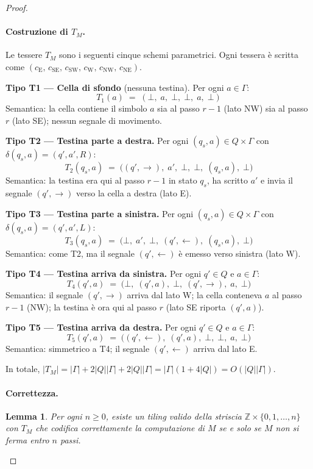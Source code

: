 \documentclass[12pt, a4paper]{article}
\newtheorem{lemma}{Lemma}
\newcommand{\moveR}{\!\rightarrow\!}
\newcommand{\moveL}{\!\leftarrow\!}
\newcommand{\edgeE}{c_{\mathrm{E}}}
\newcommand{\edgeSE}{c_{\mathrm{SE}}}
\newcommand{\edgeSW}{c_{\mathrm{SW}}}
\newcommand{\edgeW}{c_{\mathrm{W}}}
\newcommand{\edgeNW}{c_{\mathrm{NW}}}
\newcommand{\edgeNE}{c_{\mathrm{NE}}}
\begin{document}
\begin{proof}
\paragraph{Costruzione di $T_M$.}
Le tessere $T_M$ sono i seguenti cinque schemi parametrici.
Ogni tessera è scritta come $(\edgeE,\, \edgeSE,\, \edgeSW,\, \edgeW,\, \edgeNW,\, \edgeNE)$.

\medskip
\noindent\textbf{Tipo T1 — Cella di sfondo} (nessuna testina).
Per ogni $a \in \Gamma$:
\[
  T_1(a) \;=\; (\bot,\; a,\; \bot,\; \bot,\; a,\; \bot)
\]
Semantica: la cella contiene il simbolo $a$ sia al passo $r-1$ (lato NW) sia al passo $r$
(lato SE); nessun segnale di movimento.

\medskip
\noindent\textbf{Tipo T2 — Testina parte a destra.}
Per ogni $(q_s, a) \in Q \times \Gamma$ con $\delta(q_s, a) = (q', a', R)$:
\[
  T_2(q_s, a) \;=\; \bigl((q', \moveR),\; a',\; \bot,\; \bot,\; (q_s, a),\; \bot\bigr)
\]
Semantica: la testina era qui al passo $r-1$ in stato $q_s$, ha scritto $a'$ e invia il
segnale $(q', \moveR)$ verso la cella a destra (lato E).

\medskip
\noindent\textbf{Tipo T3 — Testina parte a sinistra.}
Per ogni $(q_s, a) \in Q \times \Gamma$ con $\delta(q_s, a) = (q', a', L)$:
\[
  T_3(q_s, a) \;=\; \bigl(\bot,\; a',\; \bot,\; (q', \moveL),\; (q_s, a),\; \bot\bigr)
\]
Semantica: come T2, ma il segnale $(q', \moveL)$ è emesso verso sinistra (lato W).

\medskip
\noindent\textbf{Tipo T4 — Testina arriva da sinistra.}
Per ogni $q' \in Q$ e $a \in \Gamma$:
\[
  T_4(q', a) \;=\; \bigl(\bot,\; (q', a),\; \bot,\; (q', \moveR),\; a,\; \bot\bigr)
\]
Semantica: il segnale $(q', \moveR)$ arriva dal lato W; la cella conteneva $a$ al passo
$r-1$ (NW); la testina è ora qui al passo $r$ (lato SE riporta $(q', a)$).

\medskip
\noindent\textbf{Tipo T5 — Testina arriva da destra.}
Per ogni $q' \in Q$ e $a \in \Gamma$:
\[
  T_5(q', a) \;=\; \bigl((q', \moveL),\; (q', a),\; \bot,\; \bot,\; a,\; \bot\bigr)
\]
Semantica: simmetrico a T4; il segnale $(q', \moveL)$ arriva dal lato E.

\medskip
In totale, $|T_M| = |\Gamma| + 2|Q||\Gamma| + 2|Q||\Gamma| = |\Gamma|(1 + 4|Q|) = O(|Q||\Gamma|)$.

\paragraph{Correttezza.}

\begin{lemma}
\label{lem:strip}
Per ogni $n \geq 0$, esiste un tiling valido della striscia
$\mathbb{Z} \times \{0, 1, \ldots, n\}$ con $T_M$ che codifica correttamente la computazione
di $M$ \emph{se e solo se} $M$ non si ferma entro $n$ passi.
\end{lemma}


\end{proof}
\end{document}
